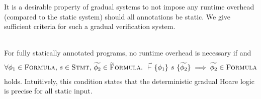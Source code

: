 It is a desirable property of gradual systems to not impose any runtime overhead (compared to the static system) should all annotations be static.
We give sufficient criteria for such a gradual verification system.
\begin{lemma}
    \label{lemma:oh-free}~\\
    For fully statically annotated programs, no runtime overhead is necessary if  and
    \begin{align}
    \label{lemma-frm:oh-free}
    \forall \phi_1 \in \textup{\textsc{Formula}},\, s \in \textup{\textsc{Stmt}},\, \widetilde{\phi_2} \in \textup{\textsc{\ensuremath{\widetilde{\text{F}}}ormula}}.~ {} \,\,\vec{\vdash}\,\, \{{\phi_1}\} ~{s}~ \{{\widetilde{\phi_2}}\} \implies \widetilde{\phi_2} \in \textup{\textsc{Formula}}
    \end{align}
    holds.
    Intuitively, this condition states that the deterministic gradual Hoare logic is precise for all static input.
    
\end{lemma}
